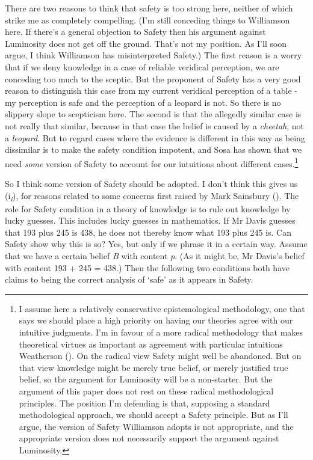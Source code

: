 \documentclass[
  11pt,
  letterpaper,
  DIV=11,
  numbers=noendperiod,
  twoside]{scrartcl}
\renewcommand{\textsc}[1]{{\scfont #1}}
\begin{document}
There are two reasons to think that safety is too strong here, neither
of which strike me as completely compelling. (I'm still conceding things
to Williamson here. If there's a general objection to Safety then his
argument against Luminosity does not get off the ground. That's not my
position. As I'll soon argue, I think Williamson has misinterpreted
Safety.) The first reason is a worry that if we deny knowledge in a case
of reliable veridical perception, we are conceding too much to the
sceptic. But the proponent of Safety has a very good reason to
distinguish this case from my current veridical perception of a table -
my perception is safe and the perception of a leopard is not. So there
is no slippery slope to scepticism here. The second is that the
allegedly similar case is not really that similar, because in that case
the belief is caused by a \emph{cheetah}, not a \emph{leopard}. But to
regard cases where the evidence is different in this way as being
dissimilar is to make the safety condition impotent, and Sosa has shown
that we need \emph{some} version of Safety to account for our intuitions
about different cases.\footnote{I assume here a relatively conservative
  epistemological methodology, one that says we should place a high
  priority on having our theories agree with our intuitive judgments.
  I'm in favour of a more radical methodology that makes theoretical
  virtues as important as agreement with particular intuitions
  Weatherson (). On the
  radical view Safety might well be abandoned. But on that view
  knowledge might be merely true belief, or merely justified true
  belief, so the argument for Luminosity will be a non-starter. But the
  argument of this paper does not rest on these radical methodological
  principles. The position I'm defending is that, supposing a standard
  methodological approach, we should accept a Safety principle. But as
  I'll argue, the version of Safety Williamson adopts is not
  appropriate, and the appropriate version does not necessarily support
  the argument against Luminosity.}

So I think some version of Safety should be adopted. I don't think this
gives us (\textsc{i}\textsubscript{\emph{i}}), for reasons related to
some concerns first raised by Mark Sainsbury
(). The role for Safety condition in a
theory of knowledge is to rule out knowledge by lucky guesses. This
includes lucky guesses in mathematics. If Mr Davis guesses that 193 plus
245 is 438, he does not thereby know what 193 plus 245 is. Can Safety
show why this is so? Yes, but only if we phrase it in a certain way.
Assume that we have a certain belief \emph{B} with content \emph{p}. (As
it might be, Mr Davis's belief with content 193 + 245 = 438.) Then the
following two conditions both have claims to being the correct analysis
of `safe' as it appears in Safety.
\end{document}
